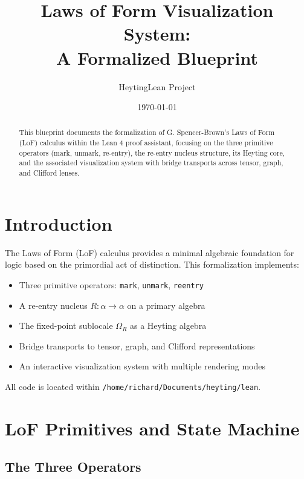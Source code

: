 \documentclass{amsart}
\title{Laws of Form Visualization System:\\A Formalized Blueprint}
\author{HeytingLean Project}
\date{\today}
\theoremstyle{definition}
\theoremstyle{remark}
\begin{document}
\maketitle

\begin{abstract}
This blueprint documents the formalization of G. Spencer-Brown's Laws of Form (LoF) calculus within the Lean 4 proof assistant, focusing on the three primitive operators (mark, unmark, re-entry), the re-entry nucleus structure, its Heyting core, and the associated visualization system with bridge transports across tensor, graph, and Clifford lenses.
\end{abstract}

\tableofcontents

\section{Introduction}

The Laws of Form (LoF) calculus provides a minimal algebraic foundation for logic based on the primordial act of distinction. This formalization implements:

\begin{itemize}
\item Three primitive operators: \texttt{mark}, \texttt{unmark}, \texttt{reentry}
\item A re-entry nucleus $R : \alpha \to \alpha$ on a primary algebra
\item The fixed-point sublocale $\Omega_R$ as a Heyting algebra
\item Bridge transports to tensor, graph, and Clifford representations
\item An interactive visualization system with multiple rendering modes
\end{itemize}

All code is located within \texttt{/home/richard/Documents/heyting/lean}.

\section{LoF Primitives and State Machine}

\subsection{The Three Operators}
\label{sec:primitives}
\end{document}
